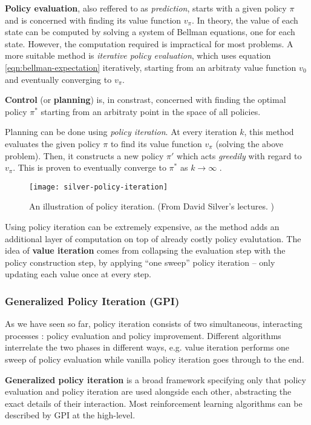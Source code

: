 \textbf{Policy evaluation}, also reffered to as \emph{prediction}, starts with a given policy $\pi$ and is concerned with finding its value function $v_{\pi}$.
In theory, the value of each state can be computed by solving a system of Bellman equations, one for each state.
However, the computation required is impractical for most problems.
A more suitable method is \emph{iterative policy evaluation}, which uses equation \ref{eqn:bellman-expectation} iteratively, starting from an arbitraty value function $v_0$ and eventually converging to $v_{\pi}$.

\textbf{Control} (or \textbf{planning}) is, in constrast, concerned with finding the optimal policy $\pi^{*}$ starting from an arbitraty point in the space of all policies.

Planning can be done using \emph{policy iteration}.
At every iteration $k$, this method evaluates the given policy $\pi$ to find its value function $v_{\pi}$ (solving the above problem).
Then, it constructs a new policy $\pi'$ which acts \emph{greedily} with regard to $v_{\pi}$.
This is proven to eventually converge to $\pi^*$ as $k \to \infty$ \cite{rlai}.

\begin{figure}[h]
    \caption{An illustration of policy iteration. (From David Silver's lectures. \cite{silver-lectures})}
    \centering
    \texttt{[image: silver-policy-iteration]}
\end{figure}

Using policy iteration can be extremely expensive, as the method adds an additional layer of computation on top of already costly policy evalutation.
The idea of \textbf{value iteration} comes from collapsing the evaluation step with the policy construction step, by applying ``one sweep'' policy iteration -- only updating each value once at every step.

\subsubsection{Generalized Policy Iteration (GPI)}
As we have seen so far, policy iteration consists of two simultaneous, interacting processes \cite{rlai}: policy evaluation and policy improvement.
Different algorithms interrelate the two phases in different ways, e.g. value iteration performs one sweep of policy evaluation while vanilla policy iteration goes through to the end.

\textbf{Generalized policy iteration} is a broad framework specifying only that policy evaluation and policy iteration are used alongside each other, abstracting the exact details of their interaction.
Most reinforcement learning algorithms can be described by GPI at the high-level.


